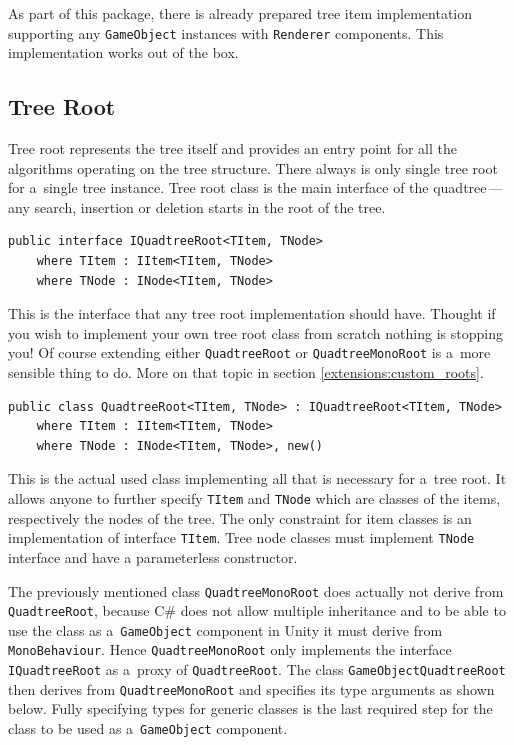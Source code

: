 \documentclass{article}
\begin{document}
As part of this package, there is already prepared tree item implementation supporting any \texttt{GameObject} instances with \texttt{Renderer} components.
This implementation works out of the box.

\subsection{Tree Root} \label{details:root}
Tree root represents the tree itself and provides an entry point for all the algorithms operating on the tree structure.
There always is only single tree root for a~single tree instance.
Tree root class is the main interface of the quadtree\,---\,any search, insertion or deletion starts in the root of the tree.

\begin{verbatim}
public interface IQuadtreeRoot<TItem, TNode>
    where TItem : IItem<TItem, TNode>
    where TNode : INode<TItem, TNode>
\end{verbatim}

This is the interface that any tree root implementation should have.
Thought if you wish to implement your own tree root class from scratch nothing is stopping you!
Of course extending either \texttt{QuadtreeRoot} or \texttt{QuadtreeMonoRoot} is a~more sensible thing to do.
More on that topic in section \ref{extensions:custom_roots}.

\begin{verbatim}
public class QuadtreeRoot<TItem, TNode> : IQuadtreeRoot<TItem, TNode>
    where TItem : IItem<TItem, TNode>
    where TNode : INode<TItem, TNode>, new()
\end{verbatim}

This is the actual used class implementing all that is necessary for a~tree root.
It allows anyone to further specify \texttt{TItem} and \texttt{TNode} which are classes of the items, respectively the nodes of the tree.
The only constraint for item classes is an implementation of interface \texttt{TItem}.
Tree node classes must implement \texttt{TNode} interface and have a parameterless constructor.

The previously mentioned class \texttt{QuadtreeMonoRoot} does actually not derive from \texttt{QuadtreeRoot}, because C\# does not allow multiple inheritance and to be able to use the class as a~\texttt{GameObject} component in Unity it must derive from \texttt{MonoBehaviour}.
Hence \texttt{QuadtreeMonoRoot} only implements the interface \texttt{IQuadtreeRoot} as a~proxy of \texttt{QuadtreeRoot}.
The class \texttt{GameObjectQuadtreeRoot} then derives from \texttt{QuadtreeMonoRoot} and specifies its type arguments as shown below.
Fully specifying types for generic classes is the last required step for the class to be used as a~\texttt{GameObject} component.
\end{document}
